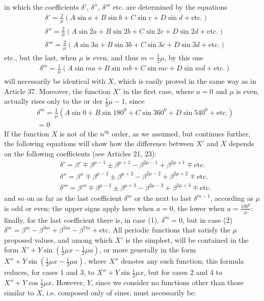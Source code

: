 in which the coefficients $\delta'$, $\delta''$, $\delta'''$ etc. are determined by the equations
\[
\begin{aligned}
&\delta'=\frac2\mu(A\sin a+B\sin b+C\sin c+D\sin d+\text{etc.})\\[6pt]
&\delta''=\frac2\mu(A\sin 2a+B\sin 2b+C\sin 2c+D\sin 2d+\text{etc.})\\[6pt]
&\delta'''=\frac2\mu(A\sin 3a+B\sin 3b+C\sin 3c+D\sin 3d+\text{etc.})
\end{aligned}
\]
etc., but the last, when $\mu$ is even, and thus $m=\frac12\mu$, by this one
\[
\begin{aligned}
&\delta^m=\frac1\mu(A\sin ma+B\sin mb+C\sin mc+D\sin md+\text{etc.})
\end{aligned}
\]
will necessarily be identical with $X$, which is easily proved in the same way as in Article 37. Moreover, the function $X'$ in the first case, where $a=0$ and $\mu$ is even, actually rises only to the or%
der $\frac12\mu-1$, since
\[
\begin{aligned}
&\delta^m=\frac1\mu(A\sin 0+B\sin 180^0+C\sin 360^0+D\sin 540^0+\text{etc.})\\[6pt]
&=0
\end{aligned}
\]
If the function $X$ is not of the $n^{\mathrm{th}}$ order, as we assumed, but continues further, the following equations will show how the difference between $X'$ and $X$ depends on the following coefficients (see Articles 21, 23):
\[
\begin{aligned}
&\delta'=\beta'\mp\beta^{\mu-1}\pm\beta^{\mu+1}-\beta^{2\mu-1}+\beta^{2\mu+1}\mp\text{etc.}\\[6pt]
&\delta''=\beta''\mp\beta^{\mu-2}\pm\beta^{\mu+2}-\beta^{2\mu-2}+\beta^{2\mu+2}\mp\text{etc.}\\[6pt]
&\delta'''=\beta'''\mp\beta^{\mu-3}\pm\beta^{\mu+3}-\beta^{2\mu-3}+\beta^{2\mu+3}\mp\text{etc.}
\end{aligned}
\]
and so on as far as the last coefficient $\delta^m$ or the next to last $\delta^{m-1}$, according as $\mu$ is odd or even; the upper signs apply here when $a=0$, the lower when $a=\frac{180^0}{\mu}$: finally, for the last coefficient there is, in case (1), $\delta^m=0$, but in case (2)
$\delta^m=\beta^m-\beta^{3m}+\beta^{5m}-\beta^{7m}+\text{etc.}$
All periodic functions that satisfy the $\mu$ proposed values, and among which $X'$ is the simplest, will be contained in the form $X'+Y\sin(\frac12\mu x-\frac12\mu a)$, or more generally in the form $X''+Y\sin(\frac12\mu x-\frac12\mu a)$, where $X''$ denotes any such function; this formula reduces, for cases 1 and 3, to $X''+Y\sin\frac12\mu x$, but for cases 2 and 4 to $X''+Y\cos\frac12\mu x$. However, $Y$, since we consider no functions other than those similar to $X$, i.e. composed only of sines, must necessarily be:
